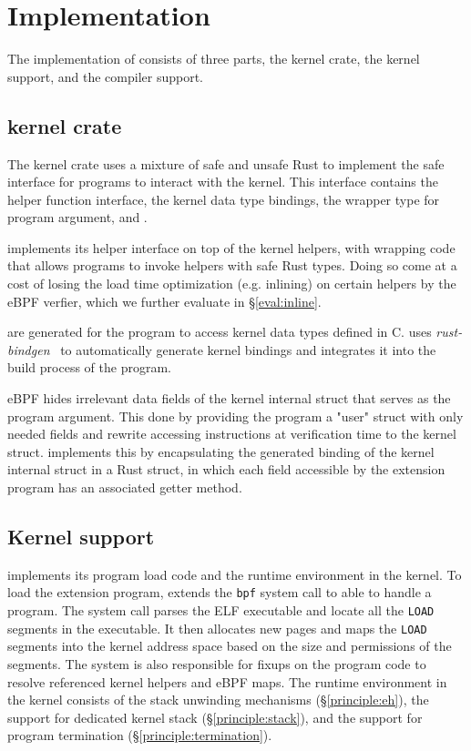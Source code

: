 \section{Implementation}
\label{sec:impl}
The implementation of \projname{} consists of three parts, the \projname{}
    kernel crate, the kernel support, and the compiler support.

\subsection{\projname{} kernel crate}
\label{impl:kernel-crate}
The kernel crate uses a mixture of safe and unsafe Rust to implement the safe
    interface for \projname{} programs to interact with the kernel.
This interface contains the helper function interface, the kernel data type
    bindings, the wrapper type for program argument, and .

\projname{} implements its helper interface on top of the kernel helpers, with
    wrapping code that allows programs to invoke helpers with safe Rust types.
Doing so come at a cost of losing the load time optimization (e.g. inlining) on
    certain helpers by the eBPF verfier, which we further evaluate in
    \S\ref{eval:inline}.

 are generated for the program to access kernel
    data types defined in C.
\projname{} uses \emph{rust-bindgen}~\cite{bindgen} to automatically generate
    kernel bindings and integrates it into the build process of the program.

eBPF hides irrelevant data fields of the kernel internal struct that serves as
    the program argument.
This done by providing the program a "user" struct with only needed fields and
    rewrite accessing instructions at verification time to the kernel struct.
\projname{} implements this by encapsulating the generated binding of the
    kernel internal struct in a Rust struct, in which each field accessible by
    the extension program has an associated getter method.

\subsection{Kernel support}
\label{impl:kernel}
\projname{} implements its program load code and the runtime environment in the
    kernel.
To load the extension program, \projname{} extends the \texttt{bpf} system
    call to able to handle a \projname{} program.
The system call parses the ELF executable and locate all the \texttt{LOAD}
    segments in the executable.
It then allocates new pages and maps the \texttt{LOAD} segments into the kernel
    address space based on the size and permissions of the segments.
The system is also responsible for fixups on the program code to resolve
    referenced kernel helpers and eBPF maps.
The \projname{} runtime environment in the kernel consists of the stack
    unwinding mechanisms (\S\ref{principle:eh}), the support for dedicated
    kernel stack (\S\ref{principle:stack}), and the support for program
    termination (\S\ref{principle:termination}).

